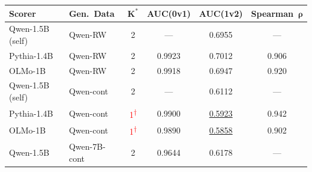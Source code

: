 {\small
\begin{tabular}{llcccc}
\toprule
\textbf{Scorer} & \textbf{Gen.\ Data} & $\boldsymbol{K^*}$ & \textbf{AUC(0v1)} & \textbf{AUC(1v2)} & \textbf{Spearman}~$\boldsymbol{\rho}$ \\
\midrule
Qwen-1.5B (self) & Qwen-RW & 2 & --- & 0.6955 & --- \\
Pythia-1.4B       & Qwen-RW & 2 & 0.9923 & 0.7012 & 0.906 \\
OLMo-1B           & Qwen-RW & 2 & 0.9918 & 0.6947 & 0.920 \\
\midrule
Qwen-1.5B (self) & Qwen-cont & 2 & --- & 0.6112 & --- \\
Pythia-1.4B       & Qwen-cont & \textcolor{red}{1\textsuperscript{$\dagger$}} & 0.9900 & \underline{0.5923} & 0.942 \\
OLMo-1B           & Qwen-cont & \textcolor{red}{1\textsuperscript{$\dagger$}} & 0.9890 & \underline{0.5858} & 0.902 \\
\midrule
Qwen-1.5B        & Qwen-7B-cont & 2 & 0.9644 & 0.6178 & --- \\
\bottomrule
\end{tabular}
}
